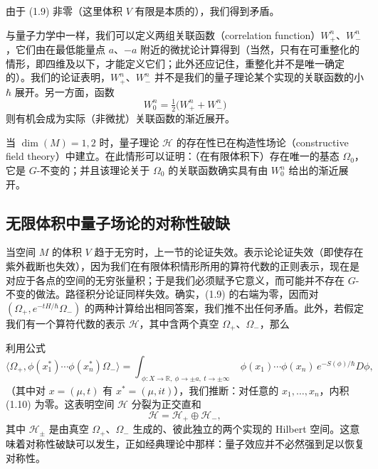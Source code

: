 由于 (1.9) 非零（这里体积 $V$ 有限是本质的），我们得到矛盾。

与量子力学中一样，我们可以定义两组关联函数（correlation function）$W^n_+$、$W^n_-$，它们由在最低能量点 $a$、$-a$ 附近的微扰论计算得到（当然，只有在可重整化的情形，即四维及以下，才能定义它们；此外还应记住，重整化并不是唯一确定的）。我们的论证表明，$W^n_+$、$W^n_-$ 并不是我们的量子理论某个实现的关联函数的小 $\hbar$ 展开。另一方面，函数
\[
W^n_0=\tfrac12\bigl(W^n_++W^n_-\bigr)
\]
则有机会成为实际（非微扰）关联函数的渐近展开。

当 $\dim(M)=1,2$ 时，量子理论 $\mathcal{H}$ 的存在性已在构造性场论（constructive field theory）中建立。在此情形可以证明：（在有限体积下）存在唯一的基态 $\Omega_0$，它是 $G$-不变的；并且该理论关于 $\Omega_0$ 的关联函数确实具有由 $W^n_0$ 给出的渐近展开。

\subsection{无限体积中量子场论的对称性破缺}

当空间 $M$ 的体积 $V$ 趋于无穷时，上一节的论证失效。表示论论证失效（即使存在紫外截断也失效），因为我们在有限体积情形所用的算符代数的正则表示，现在是对应于各点的空间的无穷张量积；于是我们必须赋予它意义，而可能并不存在 $G$-不变的做法。路径积分论证同样失效。确实，(1.9) 的右端为零，因而对 $(\Omega_+,e^{-tH/\hbar}\Omega_-)$ 的两种计算给出相同答案，我们推不出任何矛盾。此外，若假定我们有一个算符代数的表示 $\mathcal{H}$，其中含两个真空 $\Omega_+$、$\Omega_-$，那么

利用公式
\begin{equation}
  \tag{1.10}
  \label{eq:1-10}
  \langle\Omega_+,\phi(x_1^*)\cdots\phi(x_n^*)\Omega_-\rangle
  =\int_{\substack{\phi:X\to\mathbb{R},\ \phi\to\pm a,\ t\to\pm\infty}}
  \phi(x_1)\cdots\phi(x_n)\,e^{-S(\phi)/\hbar}D\phi,
\end{equation}
（其中对 $x=(\mu,t)$ 有 $x^*=(\mu,it)$），我们推断：对任意的 $x_1,\dots,x_n$，内积 (1.10) 为零。这表明空间 $\mathcal{H}$ 分裂为正交直和
\[
\mathcal{H}=\mathcal{H}_+\oplus\mathcal{H}_-,
\]
其中 $\mathcal{H}_\pm$ 是由真空 $\Omega_+$、$\Omega_-$ 生成的、彼此独立的两个实现的 Hilbert 空间。这意味着对称性破缺可以发生，正如经典理论中那样：量子效应并不必然强到足以恢复对称性。


